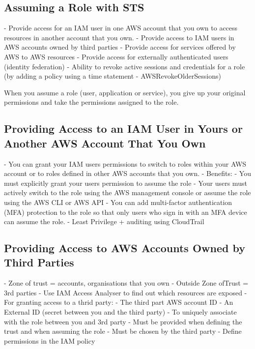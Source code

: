 \documentclass[11pt]{book}
\begin{document}
    \subsection{Assuming a Role with STS}
    - Provide access for an IAM user in one AWS account that you own to access resources in another account that you own.
    - Provide access to IAM users in AWS accounts owned by third parties
    - Provide access for services offered by AWS to AWS resources
    - Provide access for externally authenticated users (identity federation)
    - Ability to revoke active sessions and credentials for a role (by adding a policy using a time statement - AWSRevokeOlderSessions)

    When you assume a role (user, application or service), you give up your original permissions and take the permissions assigned to the role.

    \subsection{Providing Access to an IAM User in Yours or Another AWS Account That You Own}
    - You can grant your IAM users permissions to switch to roles within your AWS account or to roles defined in other AWS accounts that you own.
    - Benefits:
    - You must explicitly grant your users permission to assume the role
    - Your users must actively switch to the role using the AWS management console or assume the role using the AWS CLI or AWS API
    - You can add multi-factor authentication (MFA) protection to the role so that only users who sign in with an MFA device can assume the role.
    - Least Privilege + auditing using CloudTrail

    \subsection{Providing Access to AWS Accounts Owned by Third Parties}
    - Zone of trust = accounts, organisations that you own
    - Outside Zone ofTrust = 3rd parties
    - Use IAM Access Analyser to find out which resources are exposed
    - For granting access to a thrid party:
    - The third part AWS account ID
    - An External ID (secret between you and the third party)
    - To uniquely associate with the role between you and 3rd party
    - Must be provided when defining the trust and when assuming the role
    - Must be chosen by the third party
    - Define permissions in the IAM policy

\end{document}
